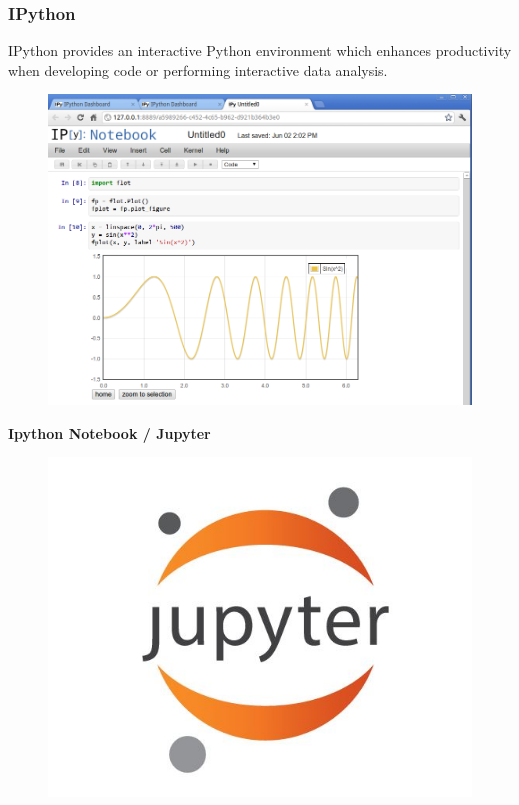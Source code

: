 \documentclass[MASTER.tex]{subfiles}
\begin{document}
\begin{frame}
\frametitle{IPython}
IPython provides an interactive Python environment which enhances productivity when developing code
or performing interactive data analysis.
\end{frame}
\begin{frame}
	
	\begin{figure}
\centering
\includegraphics[width=0.9\linewidth]{vk2Q6}

\end{figure}

\end{frame}

\begin{frame}
	\textbf{Ipython Notebook / Jupyter}
	\vspace{-0.4cm}
	\begin{figure}
\centering
\includegraphics[width=1.0\linewidth]{jupyter}

\end{figure}

\end{frame}
	
\end{document}
